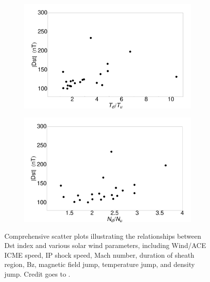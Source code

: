 \begin{figure}[!htp]
\begin{subfigure}[b]{0.45\textwidth}
	\end{subfigure}
	\begin{subfigure}[b]{0.45\textwidth}
	\includegraphics[width=\textwidth]{chapter2/figs/Fig_GS_Tjump.pdf}
\end{subfigure}
	\hfill
\begin{subfigure}[b]{0.45\textwidth}
	\includegraphics[width=\textwidth]{chapter2/figs/Fig_GS_Njump.pdf}
\end{subfigure}
	\caption{Comprehensive scatter plots illustrating the relationships between Dst index and various solar wind parameters, including Wind/ACE ICME speed, IP shock speed, Mach number, duration of sheath region, Bz, magnetic field jump, temperature jump, and density jump. Credit goes to \citet{miteva_2023}.}
	\label{fig_dst_scatterplots}
\end{figure}

